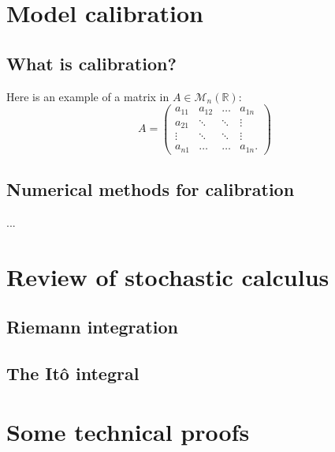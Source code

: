 \documentclass[a4paper]{article}
\theoremstyle{definition}
\newcommand{\RR}{\mathbb{R}}
\numberwithin{equation}{section}
\begin{document}
\newpage
\section{Model calibration}
\subsection{What is calibration?}
Here is an example of a matrix in $A\in\mathcal{M}_n(\RR)$:
$$
A = 
\begin{pmatrix}
a_{11} & a_{12} & \ldots & a_{1n}\\
a_{21} & \ddots & \ddots  & \vdots\\
\vdots &  \ddots & \ddots  & \vdots\\
a_{n1} &  \ldots &  \ldots & a_{1n}.
\end{pmatrix}
$$

\subsection{Numerical methods for calibration}
...




\appendix

\section{Review of stochastic calculus}
\subsection{Riemann integration}
\subsection{The It\^o integral}


\section{Some technical proofs}



\newpage

\end{document}

